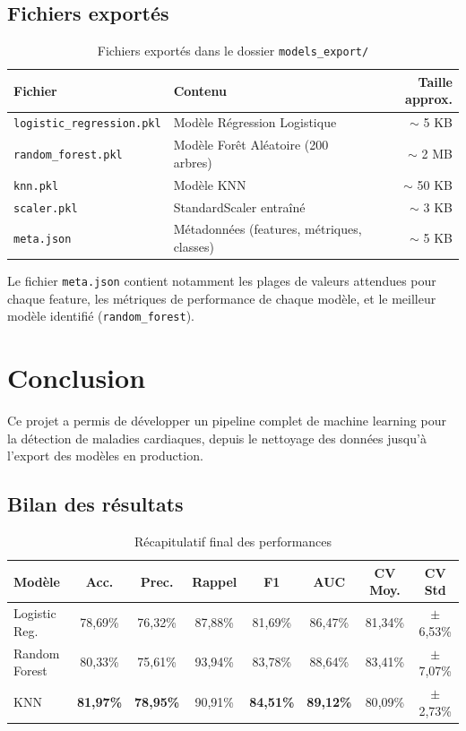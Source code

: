 \documentclass[12pt,a4paper]{article}
\newcommand{\best}[1]{\textbf{\textcolor{medgreen}{#1}}}
\begin{document}
		\subsection{Fichiers exportés}
		
		\begin{table}[H]
			\centering
			\caption{Fichiers exportés dans le dossier \texttt{models\_export/}}
			\begin{tabular}{llr}
				\toprule
				\textbf{Fichier} & \textbf{Contenu} & \textbf{Taille approx.} \\
				\midrule
				\texttt{logistic\_regression.pkl} & Modèle Régression Logistique & $\sim$ 5 KB \\
				\texttt{random\_forest.pkl}       & Modèle Forêt Aléatoire (200 arbres) & $\sim$ 2 MB \\
				\texttt{knn.pkl}                  & Modèle KNN & $\sim$ 50 KB \\
				\texttt{scaler.pkl}               & StandardScaler entraîné & $\sim$ 3 KB \\
				\texttt{meta.json}                & Métadonnées (features, métriques, classes) & $\sim$ 5 KB \\
				\bottomrule
			\end{tabular}
		\end{table}
		
		Le fichier \texttt{meta.json} contient notamment les plages de valeurs attendues pour chaque feature, les métriques de performance de chaque modèle, et le meilleur modèle identifié (\texttt{random\_forest}).
		
		\section{Conclusion}
		
		Ce projet a permis de développer un pipeline complet de machine learning pour la détection de maladies cardiaques, depuis le nettoyage des données jusqu'à l'export des modèles en production.
		
		\subsection{Bilan des résultats}
		
		\begin{table}[H]
			\centering
			\caption{Récapitulatif final des performances}
			\begin{tabular}{lccccccc}
				\toprule
				\textbf{Modèle} & \textbf{Acc.} & \textbf{Prec.} & \textbf{Rappel} & \textbf{F1} & \textbf{AUC} & \textbf{CV Moy.} & \textbf{CV Std} \\
				\midrule
				Logistic Reg.   & 78{,}69\% & 76{,}32\% & 87{,}88\% & 81{,}69\% & 86{,}47\% & 81{,}34\% & $\pm$6{,}53\% \\
				Random Forest & 80{,}33\% & 75{,}61\% & 93{,}94\% & 83{,}78\% & 88{,}64\% & 83{,}41\% & $\pm$7{,}07\% \\
				KNN             & \best{81{,}97\%} & \best{78{,}95\%} & 90{,}91\% & \best{84{,}51\%} & \best{89{,}12\%} & 80{,}09\% & $\pm$2{,}73\% \\
				\bottomrule
			\end{tabular}
		\end{table}
		
\end{document}
